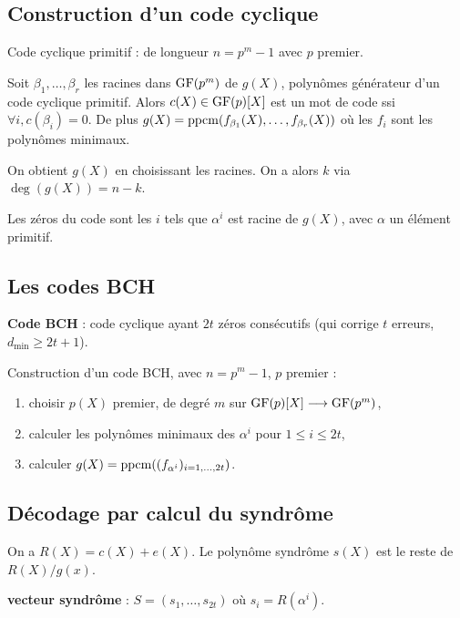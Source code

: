 \subsection{Construction d'un code cyclique}

	Code cyclique primitif : de longueur $n = p^m - 1$ avec $p$ premier.
	
	\begin{thm}
		Soit $\beta_1,\ldots,\beta_r$ les racines dans $\mathrm{GF}(p^m)$ de $g(X)$, polynômes générateur d'un code cyclique primitif.
		Alors $c(X) \in \mathrm{GF}(p)[X]$ est un mot de code ssi $\forall i, c(\beta_i) = 0$.
		De plus $g(X) = \operatorname{ppcm}(f_{\beta_1}(X),\ldots,f_{\beta_r}(X))$ où les $f_i$ sont les polynômes minimaux.
	\end{thm}

	On obtient $g(X)$ en choisissant les racines.
	On a alors $k$ via $\deg(g(X)) = n - k$.
	
	Les zéros du code sont les $i$ tels que $\alpha^i$ est racine de $g(X)$, avec $\alpha$ un élément primitif.


\subsection{Les codes BCH}

	\begin{defn}
		\textbf{Code BCH} : code cyclique ayant $2t$ zéros consécutifs (qui corrige $t$ erreurs, $d_{\min} \geq 2t + 1$).
	\end{defn}
	
	Construction d'un code BCH, avec $n = p^m - 1$, $p$ premier :
	\begin{enumerate}[1)]
		\item choisir $p(X)$ premier, de degré $m$ sur $\mathrm{GF}(p)[X] \longrightarrow \mathrm{GF}(p^m)$,
		\item calculer les polynômes minimaux des $\alpha^i$ pour $1 \leq i \leq 2t$,
		\item calculer $g(X) = \operatorname{ppcm}((f_{\alpha^i})_{i = 1,\ldots,2t})$.
	\end{enumerate}


\subsection{Décodage par calcul du syndrôme}

	On a $R(X) = c(X) + e(X)$.
	Le polynôme syndrôme $s(X)$ est le reste de $R(X)/g(x)$.
	
	\begin{defn}
		\textbf{vecteur syndrôme} : $S = (s_1,\ldots,s_{2t})$ où $s_i = R(\alpha^i)$.
	\end{defn}

